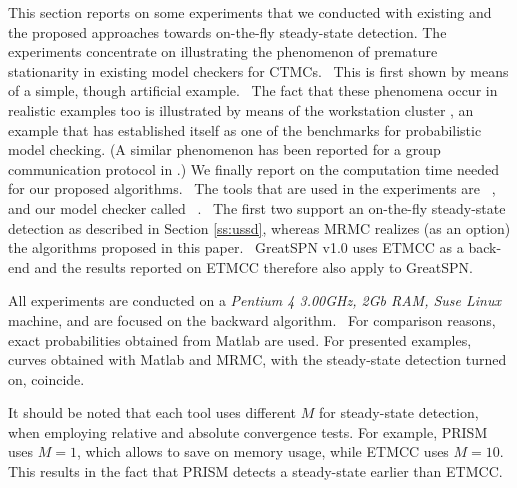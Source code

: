 \documentclass[times, 10pt,twocolumn]{article}
\begin{document}
	This section reports on some experiments that we conducted with existing and the proposed approaches towards on-the-fly steady-state detection. The experiments concentrate on illustrating the phenomenon of premature stationarity in existing model checkers for CTMCs.  This is first shown by means of a simple, though artificial example.  The fact that these phenomena occur in realistic examples too is illustrated by means of the workstation cluster \cite{HaverkortHK_SRDS00, BuchholzKKT_JLAP03, YounesKNP_TACAS04, KwiatkowskaNP_IMTTCPE02, Prism_WC05}, an example that has established itself as one of the benchmarks for probabilistic model checking. (A similar phenomenon has been reported for a group communication protocol in \cite{MassinkKL_DSN04}.) We finally report on the computation time needed for our proposed algorithms.  The tools that are used in the experiments are \prism ~\cite{KwiatkowskaNP_QEST04}, \etmcc ~\cite{HermansKMS_IJSTTT03} and our model checker called \mrmc ~\cite{KatoenKZ_QEST05}.  The first two support an on-the-fly steady-state detection as described in Section \ref{ss:ussd}, whereas MRMC realizes (as an option) the algorithms proposed in this paper.  GreatSPN v1.0 \cite{DAprileDS_DS04} uses ETMCC as a back-end and the results reported on ETMCC therefore also apply to GreatSPN.

	All experiments are conducted on a \emph{Pentium 4 3.00GHz, 2Gb RAM, Suse Linux} machine, and are focused on the backward algorithm.  For comparison reasons, exact probabilities obtained from Matlab are used. For presented examples, curves obtained with Matlab and MRMC, with the steady-state detection turned on, coincide.

	It should be noted that each tool uses different $M$ for steady-state detection, when employing relative and absolute convergence tests. For example, PRISM uses $M=1$, which allows to save on memory usage, while ETMCC uses $M=10$. This results in the fact that PRISM detects a steady-state earlier than ETMCC.
	
\end{document}

